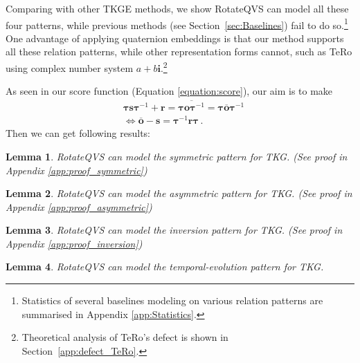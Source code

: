 \documentclass[11pt]{article}
\newcommand{\secref}[1]{Section~\ref{#1}\xspace}
\newcommand{\vect}[1]{\mathbf{#1}\xspace}
\newcommand{\vecti}{\vect{i}\xspace}
\newcommand{\vects}{\vect{s}\xspace}
\newcommand{\vectr}{\vect{r}\xspace}
\newcommand{\vecto}{\vect{o}\xspace}
\newtheorem{lemma}{Lemma}
\begin{document}
Comparing with other TKGE methods, we show RotateQVS can model all these four patterns, while previous methods (see \secref{sec:Baselines}) fail to do so.\footnote{
Statistics of several baselines modeling on various relation patterns are summarised in Appendix \ref{app:Statistics}.}
One advantage of applying quaternion embeddings is that our method supports all these relation patterns, while other representation forms cannot, such as TeRo \cite{xu2020tero} using complex number system $a+b\vecti$.\footnote{Theoretical analysis of TeRo's defect is shown in Section~\ref{app:defect_TeRo}.}

As seen in our score function (Equation \ref{equation:score}), our aim is to make 
\begin{equation} \label{equation:relation_basic}
\begin{aligned}
& \pmb{\tau} \vects \pmb{\tau}^{-1} + \vectr = \overline{ \pmb{\tau} \vecto \pmb{\tau}^{-1}} = \pmb{\tau} \overline{\vecto} \pmb{\tau}^{-1}\\
& \Leftrightarrow 
  \overline{\vecto} - \vects  = \pmb{\tau}^{-1} \vectr \pmb{\tau} \, .
\end{aligned}
\end{equation}
Then we can get following results:

\begin{lemma}\label{lemma:symmetric}
RotateQVS can model the symmetric pattern for TKG. (See proof in Appendix \ref{app:proof_symmetric})
\end{lemma}

\begin{lemma}\label{lemma:asymmetric}
RotateQVS can model the asymmetric pattern for TKG. (See proof in Appendix \ref{app:proof_asymmetric})
\end{lemma}

\begin{lemma}\label{lemma:inversion}
RotateQVS can model the inversion pattern for TKG. (See proof in Appendix \ref{app:proof_inversion})
\end{lemma}

\begin{lemma}\label{lemma:temporal-evolution}
RotateQVS can model the temporal-evolution pattern for TKG.
\end{lemma}
\end{document}
